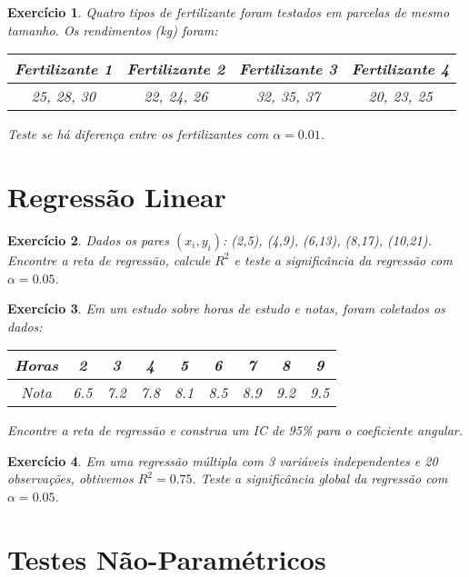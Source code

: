 \documentclass[12pt,a4paper]{article}
\newtheorem{exercise}{Exercício}
\begin{document}
\begin{exercise}
Quatro tipos de fertilizante foram testados em parcelas de mesmo tamanho. Os rendimentos (kg) foram:
\begin{center}
\begin{tabular}{|c|c|c|c|}
\hline
Fertilizante 1 & Fertilizante 2 & Fertilizante 3 & Fertilizante 4 \\
\hline
25, 28, 30 & 22, 24, 26 & 32, 35, 37 & 20, 23, 25 \\
\hline
\end{tabular}
\end{center}
Teste se há diferença entre os fertilizantes com $\alpha = 0.01$.
\end{exercise}

\section{Regressão Linear}

\begin{exercise}
Dados os pares $(x_i, y_i)$: (2,5), (4,9), (6,13), (8,17), (10,21). Encontre a reta de regressão, calcule $R^2$ e teste a significância da regressão com $\alpha = 0.05$.
\end{exercise}

\begin{exercise}
Em um estudo sobre horas de estudo e notas, foram coletados os dados:
\begin{center}
\begin{tabular}{|c|c|c|c|c|c|c|c|c|}
\hline
Horas & 2 & 3 & 4 & 5 & 6 & 7 & 8 & 9 \\
\hline
Nota & 6.5 & 7.2 & 7.8 & 8.1 & 8.5 & 8.9 & 9.2 & 9.5 \\
\hline
\end{tabular}
\end{center}
Encontre a reta de regressão e construa um IC de 95\% para o coeficiente angular.
\end{exercise}

\begin{exercise}
Em uma regressão múltipla com 3 variáveis independentes e 20 observações, obtivemos $R^2 = 0.75$. Teste a significância global da regressão com $\alpha = 0.05$.
\end{exercise}

\section{Testes Não-Paramétricos}
\end{document}
